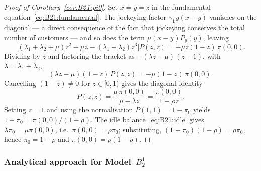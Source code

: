 \begin{proof}[Proof of Corollary~\ref{cor:B21:pi0}]
Set $x=y=z$ in the fundamental equation~\eqref{eq:B21:fundamental}. The jockeying factor
$\gamma_1 y(x-y)$ vanishes on the diagonal --- a direct consequence of the fact that
jockeying conserves the total number of customers --- and so does the term
$\mu(x-y)P_y(y)$, leaving
\begin{equation*}
    \bigl[(\lambda_1+\lambda_2+\mu)z^2 - \mu z - (\lambda_1+\lambda_2)z^3\bigr]P(z,z)
    = -\mu z(1-z)\,\pi(0,0).
\end{equation*}
Dividing by $z$ and factoring the bracket as $-(\lambda z-\mu)(z-1)$, with
$\lambda=\lambda_1+\lambda_2$,
\begin{equation*}
    (\lambda z-\mu)(1-z)\,P(z,z) = -\mu(1-z)\,\pi(0,0).
\end{equation*}
Cancelling $(1-z)\ne0$ for $z\in[0,1)$ gives the diagonal identity
\begin{equation}
    P(z,z) = \frac{\mu\,\pi(0,0)}{\mu-\lambda z} = \frac{\pi(0,0)}{1-\rho z}.
    \label{eq:B21:Pzz}
\end{equation}
Setting $z=1$ and using the normalisation $P(1,1)=1-\pi_0$ yields
$1-\pi_0=\pi(0,0)/(1-\rho)$. The idle balance~\eqref{eq:B21:idle} gives
$\lambda\pi_0=\mu\pi(0,0)$, i.e.\ $\pi(0,0)=\rho\pi_0$; substituting,
$(1-\pi_0)(1-\rho)=\rho\pi_0$, hence $\pi_0=1-\rho$ and $\pi(0,0)=\rho(1-\rho)$.
\end{proof}

\subsubsection{Analytical approach for Model~\texorpdfstring{$B_2^1$}{B21}}\label{sssec:B21:analytical}

